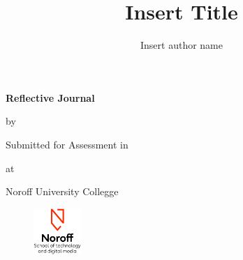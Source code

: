 \begin{titlepage}
  \begin{center}


      {\bfseries{\Huge{Reflective Journal}}}


      {\Large{by}}

    \begin{author}
      \author{\Large{Insert author name}}
    \end{author}


    \vspace*{2.5cm}
    Submitted for Assessment in


    \begin{title}
        \title{\bfseries{\huge{Insert Title}}}
    \end{title}

    \vspace*{2.5cm}
    at


    \Large{Noroff University Collegge}

    \vfill


    \begin{figure}[h!]
      \centering
      \includegraphics[height=50pt]{Noroff-Logo.png}
    \end{figure}


  \end{center}
\end{titlepage}
